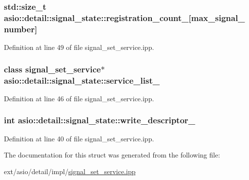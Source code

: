 \subsubsection[{registration\+\_\+count\+\_\+}]{\setlength{\rightskip}{0pt plus 5cm}std\+::size\+\_\+t asio\+::detail\+::signal\+\_\+state\+::registration\+\_\+count\+\_\+\mbox{[}{\bf max\+\_\+signal\+\_\+number}\mbox{]}}\label{structasio_1_1detail_1_1signal__state_afeeb1dcf109939a4d0cd91359c62f7e2}


Definition at line 49 of file signal\+\_\+set\+\_\+service.\+ipp.

\hypertarget{structasio_1_1detail_1_1signal__state_ad3a5677437674270e46cf8a642d29b0e}{}
\subsubsection[{service\+\_\+list\+\_\+}]{\setlength{\rightskip}{0pt plus 5cm}class {\bf signal\+\_\+set\+\_\+service}$\ast$ asio\+::detail\+::signal\+\_\+state\+::service\+\_\+list\+\_\+}\label{structasio_1_1detail_1_1signal__state_ad3a5677437674270e46cf8a642d29b0e}


Definition at line 46 of file signal\+\_\+set\+\_\+service.\+ipp.

\hypertarget{structasio_1_1detail_1_1signal__state_a3c979ca2050daff239c9882150869d19}{}
\subsubsection[{write\+\_\+descriptor\+\_\+}]{\setlength{\rightskip}{0pt plus 5cm}int asio\+::detail\+::signal\+\_\+state\+::write\+\_\+descriptor\+\_\+}\label{structasio_1_1detail_1_1signal__state_a3c979ca2050daff239c9882150869d19}


Definition at line 40 of file signal\+\_\+set\+\_\+service.\+ipp.



The documentation for this struct was generated from the following file\+:\begin{DoxyCompactItemize}
\item 
ext/asio/detail/impl/\hyperlink{signal__set__service_8ipp}{signal\+\_\+set\+\_\+service.\+ipp}\end{DoxyCompactItemize}
